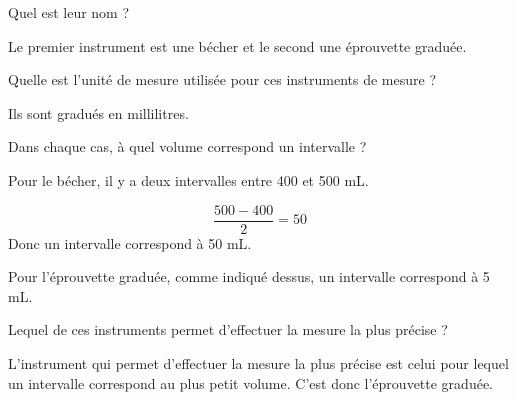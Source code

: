 \begin{questions}
	\question[1] Quel est leur nom ?

		\begin{solution}
			Le premier instrument est une bécher et le second une éprouvette graduée.
		\end{solution}
	
	\question[1] Quelle est l'unité de mesure utilisée pour ces instruments de mesure ?
	
	\begin{solution}
		Ils sont gradués en millilitres.
	\end{solution}

	\question[1] Dans chaque cas, à quel volume correspond un intervalle ?
	\begin{solution}
		Pour le bécher, il y a deux intervalles entre 400 et 500 mL. 
		
		\begin{equation*}
			\frac{500 - 400}{2} = 50
		\end{equation*}
		Donc un intervalle correspond à 50 mL.
		
		Pour l'éprouvette graduée, comme indiqué dessus, un intervalle correspond à 5 mL.
	\end{solution}
	
	
	\question[1] Lequel de ces instruments permet d'effectuer la mesure la plus précise ?
	\begin{solution}
		L'instrument qui permet d'effectuer la mesure la plus précise est celui pour lequel un intervalle correspond au plus petit volume. C'est donc l'éprouvette graduée.
	\end{solution}
	

\end{questions}